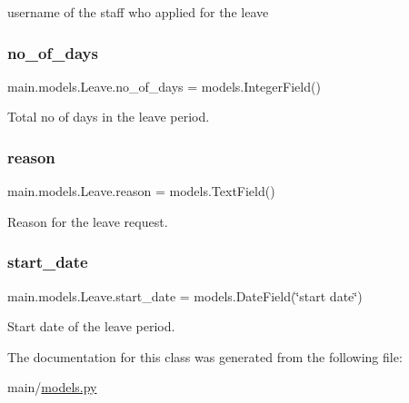 username of the staff who applied for the leave 

\mbox{\label{classmain_1_1models_1_1Leave_a99445fa4624f6668e3e881e0612ebd10}} 
\subsubsection{\texorpdfstring{no\+\_\+of\+\_\+days}{no\_of\_days}}
{\footnotesize\ttfamily main.\+models.\+Leave.\+no\+\_\+of\+\_\+days = models.\+Integer\+Field()\hspace{0.3cm}{\ttfamily [static]}}



Total no of days in the leave period. 

\mbox{\label{classmain_1_1models_1_1Leave_af65436e87a630c5d204bb91f8c0ccf01}} 
\subsubsection{\texorpdfstring{reason}{reason}}
{\footnotesize\ttfamily main.\+models.\+Leave.\+reason = models.\+Text\+Field()\hspace{0.3cm}{\ttfamily [static]}}



Reason for the leave request. 

\mbox{\label{classmain_1_1models_1_1Leave_ad385bab40efa61e41021f8bdeccfbd4f}} 
\subsubsection{\texorpdfstring{start\+\_\+date}{start\_date}}
{\footnotesize\ttfamily main.\+models.\+Leave.\+start\+\_\+date = models.\+Date\+Field(\char`\"{}start date\char`\"{})\hspace{0.3cm}{\ttfamily [static]}}



Start date of the leave period. 



The documentation for this class was generated from the following file\+:\begin{DoxyCompactItemize}
\item 
main/\hyperlink{models_8py}{models.\+py}\end{DoxyCompactItemize}
